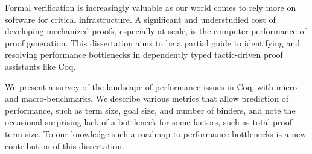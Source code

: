 %
%
%
%
%
%

Formal verification is increasingly valuable as our world comes to rely more on software for critical infrastructure.
A significant and understudied cost of developing mechanized proofs, especially at scale, is the computer performance of proof generation.
This dissertation aims to be a partial guide to identifying and resolving performance bottlenecks in dependently typed tactic-driven proof assistants like Coq.

We present a survey of the landscape of performance issues in Coq, with micro- and macro-benchmarks.
We describe various metrics that allow prediction of performance, such as term size, goal size, and number of binders, and note the occasional surprising lack of a bottleneck for some factors, such as total proof term size.
To our knowledge such a roadmap to performance bottlenecks is a new contribution of this dissertation.

